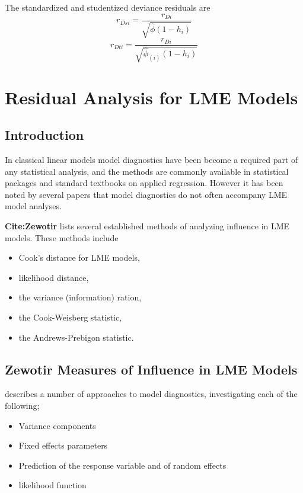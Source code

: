 
The standardized and studentized deviance residuals are
\[
r_{Dsi} = \frac{r_{Di}}{\sqrt{\hat{ \phi} (1- h_{i})} }\]
\[r_{Dti} = \frac{r_{Di}}{\sqrt{ \hat{ \phi}_{(i)}
 (1- h_{i})}}\]
 

\section{Residual Analysis for LME Models}
\subsection{Introduction}%
In classical linear models model diagnostics have been become a required part of any statistical analysis, and the methods are commonly available in statistical packages and standard textbooks on applied regression. However it has been noted by several papers that model diagnostics do not often accompany LME model analyses.

\textbf{Cite:Zewotir} lists several established methods of analyzing influence in LME models. These methods include \begin{itemize}
\item Cook's distance for LME models,
\item {} likelihood distance,
\item the variance (information) ration,
\item the  Cook-Weisberg statistic,
\item the  Andrews-Prebigon statistic.
\end{itemize}

\subsection{Zewotir Measures of Influence in LME Models}%
\citet{Zewotir} describes a number of approaches to model diagnostics, investigating each of the following;
\begin{itemize}
\item Variance components
\item Fixed effects parameters
\item Prediction of the response variable and of random effects
\item likelihood function
\end{itemize}

